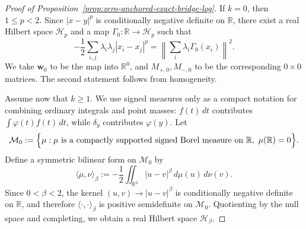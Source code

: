 \documentclass[11pt]{article}
\theoremstyle{definition}
\newcommand{\R}{\mathbb R}
\begin{document}
\begin{proof}[Proof of Proposition~\ref{prop:zero-anchored-exact-bridge-log}]
If \(k=0\), then \(1\le p<2\). Since \(|x-y|^p\) is conditionally negative definite on \(\R\), there exist a real Hilbert space \(\mathcal H_p\) and a map \(\Gamma_0:\R\to\mathcal H_p\) such that
\[
-\frac12\sum_{i,j}\lambda_i\lambda_j|x_i-x_j|^p
=
\left\|\sum_i\lambda_i\Gamma_0(x_i)\right\|^2.
\]
We take \(\boldsymbol w_0\) to be the map into \(\mathbb R^0\), and \(M_{+,0},M_{-,0}\) to be the corresponding \(0\times0\) matrices. The second statement follows from homogeneity.

   Assume now that \(k\ge1\). We use signed measures only as a compact notation for combining ordinary integrals and point masses: \(f(t)\,dt\) contributes \(\int \varphi(t)f(t)\,dt\), while \(\delta_y\) contributes \(\varphi(y)\). Let
\[
\mathcal M_0:=
\Bigl\{
\mu:\mu\ \text{is a compactly supported signed Borel measure on }\mathbb R,\
\mu(\mathbb R)=0
\Bigr\}.
\]
Define a symmetric bilinear form on $\mathcal M_0$ by
\[
\langle \mu,\nu\rangle_\beta
:=
-\frac12\iint_{\mathbb R^2}|u-v|^\beta\,d\mu(u)\,d\nu(v).
\]
Since $0<\beta<2$, the kernel $(u,v)\rightarrow |u-v|^\beta$ is conditionally negative
definite on $\mathbb R$, and therefore $\langle\cdot,\cdot\rangle_\beta$ is positive
semidefinite on $\mathcal M_0$. Quotienting by the null space and completing, we
obtain a real Hilbert space $\mathcal H_\beta$.


\end{proof}
\end{document}
